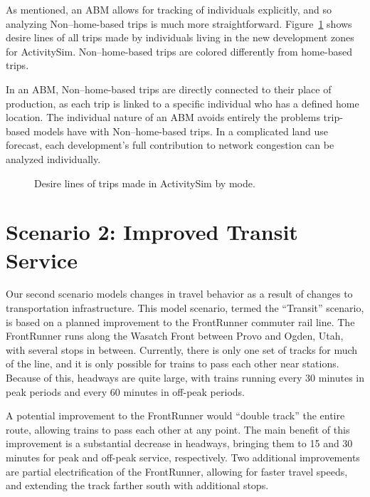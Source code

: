 \documentclass[fancy, twoside, mastersfancy, ms]{byuthesis}
\begin{document}
As mentioned, an ABM allows for tracking of individuals explicitly, and
so analyzing Non--home-based trips is much more straightforward.
Figure~\ref{fig-lu-desire-asim} shows desire lines of all trips made by
individuals living in the new development zones for ActivitySim.
Non--home-based trips are colored differently from home-based trips.

In an ABM, Non--home-based trips are directly connected to their place
of production, as each trip is linked to a specific individual who has a
defined home location. The individual nature of an ABM avoids entirely
the problems trip-based models have with Non--home-based trips. In a
complicated land use forecast, each development's full contribution to
network congestion can be analyzed individually.

\begin{figure}


\caption{\label{fig-lu-desire-asim}Desire lines of trips made in
ActivitySim by mode.}

\end{figure}%


\chapter{Scenario 2: Improved Transit Service}\label{sec-transit}

Our second scenario models changes in travel behavior as a result of
changes to transportation infrastructure. This model scenario, termed
the ``Transit'' scenario, is based on a planned improvement to the
FrontRunner commuter rail line. The FrontRunner runs along the Wasatch
Front between Provo and Ogden, Utah, with several stops in between.
Currently, there is only one set of tracks for much of the line, and it
is only possible for trains to pass each other near stations. Because of
this, headways are quite large, with trains running every 30 minutes in
peak periods and every 60 minutes in off-peak periods.

A potential improvement to the FrontRunner would ``double track'' the
entire route, allowing trains to pass each other at any point. The main
benefit of this improvement is a substantial decrease in headways,
bringing them to 15 and 30 minutes for peak and off-peak service,
respectively. Two additional improvements are partial electrification of
the FrontRunner, allowing for faster travel speeds, and extending the
track farther south with additional stops.
\end{document}
